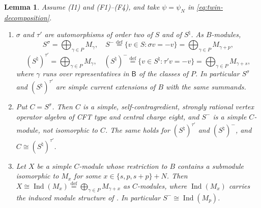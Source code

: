 \documentclass[leqno]{article}
\newcommand{\ov}{\overset}
\DeclareMathOperator{\Ind}{Ind}
\newtheorem{lemma}[thm]{Lemma}
\numberwithin{equation}{section}
\begin{document}
\begin{lemma}
\label{lem:fixed-points}
Assume \textup{(I1)} and \textup{(F1)}--\textup{(F4)}, and take $\psi = \psi_N$ in \eqref{eq:twin-decomposition}.
\begin{enumerate}
\item $\sigma$ and $\tau'$ are automorphisms of order two of $S$ and of $S^\natural$. As $B$-modules,
\[
S^\sigma = \bigoplus_{\gamma \in P} M_{\gamma},
\quad
S^- \ov{\mathrm{def}}{=} \{v \in S : \sigma v = -v\} = \bigoplus_{\gamma \in P} M_{\gamma+p},
\]
\[
(S^\natural)^{\tau'} = \bigoplus_{\gamma \in P} M_{\gamma},
\quad
(S^\natural)^- \ov{\mathrm{def}}{=} \{v \in S^\natural : \tau' v = -v\} = \bigoplus_{\gamma \in P} M_{\gamma+s},
\]
where $\gamma$ runs over representatives in $\mathsf B$ of the classes of $P$. In particular $S^\sigma$ and $(S^\natural)^{\tau'}$ are simple current extensions of $B$ with the same summands.
\item Put $C = S^\sigma$. Then $C$ is a simple, self-contragredient, strongly rational vertex operator algebra of CFT type and central charge eight, and $S^-$ is a simple $C$-module, not isomorphic to $C$. The same holds for $(S^\natural)^{\tau'}$ and $(S^\natural)^-$, and $C \cong (S^\natural)^{\tau'}$.
\item Let $X$ be a simple $C$-module whose restriction to $B$ contains a submodule isomorphic to $M_{x}$ for some $x \in \{s, p, s+p\}+N$. Then $X \cong \Ind(M_x) \ov{\mathrm{def}}{=} \bigoplus_{\gamma \in P} M_{\gamma+x}$ as $C$-modules, where $\Ind(M_x)$ carries the induced module structure of \cite{HKL15,CKM22}. In particular $S^- \cong \Ind(M_p)$.
\end{enumerate}
\end{lemma}
\end{document}
